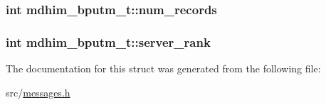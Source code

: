 \hypertarget{structmdhim__bputm__t_ad075b00254b3f26231b57134995d017b}{
\subsubsection[{num\-\_\-records}]{\setlength{\rightskip}{0pt plus 5cm}int mdhim\-\_\-bputm\-\_\-t\-::num\-\_\-records}}\label{d1/ddf/structmdhim__bputm__t_ad075b00254b3f26231b57134995d017b}
\hypertarget{structmdhim__bputm__t_afd28a1e8797725473429ebed5ccc6800}{
\subsubsection[{server\-\_\-rank}]{\setlength{\rightskip}{0pt plus 5cm}int mdhim\-\_\-bputm\-\_\-t\-::server\-\_\-rank}}\label{d1/ddf/structmdhim__bputm__t_afd28a1e8797725473429ebed5ccc6800}


The documentation for this struct was generated from the following file\-:\begin{DoxyCompactItemize}
\item 
src/\hyperlink{messages_8h}{messages.\-h}\end{DoxyCompactItemize}

